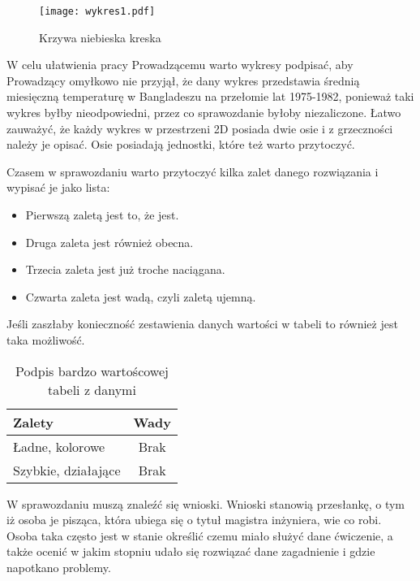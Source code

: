 \documentclass[a4paper,12pt]{article}
\newenvironment{lista}{
\begin{itemize}
  \setlength{\itemsep}{1pt}
  \setlength{\parskip}{0pt}
  \setlength{\parsep}{0pt}
}{\end{itemize}}
\begin{document}
\begin{wrapfigure}{r}{0.5\textwidth}
  \vspace{-20pt}
  \begin{center}
  \texttt{[image: wykres1.pdf]}
  \end{center}
  \vspace{-20pt}
  \caption{Krzywa niebieska kreska}
  \vspace{-10pt}
\end{wrapfigure}


W celu ułatwienia pracy Prowadzącemu warto wykresy podpisać, aby Prowadzący omyłkowo nie przyjął, że dany wykres przedstawia średnią miesięczną temperaturę w Bangladeszu na przełomie lat 1975-1982, ponieważ taki wykres byłby nieodpowiedni, przez co sprawozdanie byłoby niezaliczone. Łatwo zauważyć, że każdy wykres w przestrzeni 2D posiada dwie osie i z grzeczności należy je opisać. Osie posiadają jednostki, które też warto przytoczyć.

Czasem w sprawozdaniu warto przytoczyć kilka zalet danego rozwiązania i wypisać je jako lista:
\begin{lista}
 \item Pierwszą zaletą jest to, że jest.
 \item Druga zaleta jest również obecna.
 \item Trzecia zaleta jest już troche naciągana.
 \item Czwarta zaleta jest wadą, czyli zaletą ujemną.
\end{lista}

Jeśli zaszłaby konieczność zestawienia danych wartości w tabeli to również jest taka możliwość.

\begin{table}[!hbp]
\centering
\begin{tabular}{|p{5cm}|c|}
\hline 
Zalety & Wady \tabularnewline
\hline 
 Ładne, kolorowe & Brak\tabularnewline
 Szybkie, działające & Brak\tabularnewline
\hline
\end{tabular}
\caption{Podpis bardzo wartoścowej tabeli z danymi}
\end{table}


W sprawozdaniu muszą znaleźć się wnioski. Wnioski stanowią przesłankę, o tym iż osoba je pisząca, która ubiega się o tytuł magistra inżyniera, wie co robi. Osoba taka często jest w stanie określić czemu miało służyć dane ćwiczenie, a także ocenić w jakim stopniu udało się rozwiązać dane zagadnienie i gdzie napotkano problemy.
\end{document}
